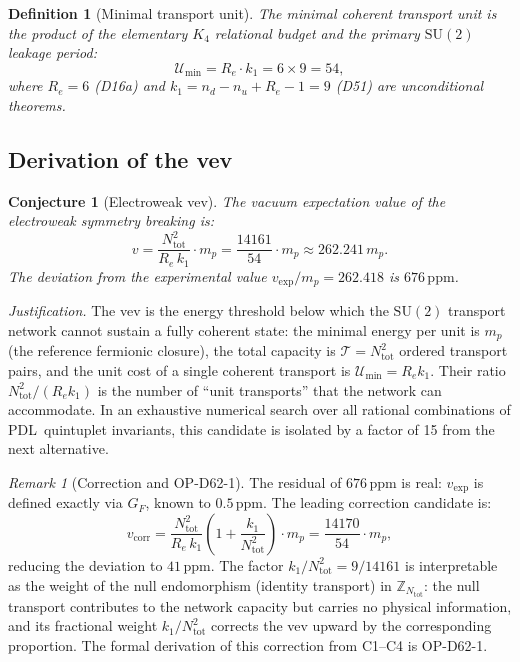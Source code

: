 \documentclass[12pt,a4paper]{article}
\newtheorem{definition}[theorem]{Definition}
\newtheorem{conjecture}[theorem]{Conjecture}
\theoremstyle{remark}
\newtheorem{remark}[theorem]{Remark}
\newcommand{\PDL}{\textsc{pdl}}
\newcommand{\Ntot}{N_{\mathrm{tot}}}
\newcommand{\vev}{v}
\newcommand{\ppm}{\,\mathrm{ppm}}
\newcommand{\mproton}{m_{p}}
\def\PDL{PDL}%
\begin{document}
\begin{definition}[Minimal transport unit]\label{def:mtu}
The minimal coherent transport unit is the product of the elementary $K_4$
relational budget and the primary $\mathrm{SU}(2)$ leakage period:
\begin{equation}
\mathcal{U}_{\min} = R_{e}\cdot k_{1} = 6\times9 = 54,
\end{equation}
where $R_{e}=6$ (D16a) and $k_{1}=n_{d}-n_{u}+R_{e}-1=9$ (D51) are
unconditional theorems.
\end{definition}

\subsection{Derivation of the vev}

\begin{conjecture}[Electroweak vev]\label{conj:vev}
The vacuum expectation value of the electroweak symmetry breaking is:
\begin{equation}\label{eq:vev}
\vev = \frac{\Ntot^{2}}{R_{e}\,k_{1}}\cdot\mproton
= \frac{14161}{54}\cdot\mproton \approx 262.241\,\mproton.
\end{equation}
The deviation from the experimental value $\vev_{\exp}/\mproton=262.418$ is
$676\ppm$.
\end{conjecture}

\emph{Justification.} The vev is the energy threshold below which the
$\mathrm{SU}(2)$ transport network cannot sustain a fully coherent state: the
minimal energy per unit is $\mproton$ (the reference fermionic closure), the
total capacity is $\mathcal{T}=\Ntot^{2}$ ordered transport pairs, and the
unit cost of a single coherent transport is $\mathcal{U}_{\min}=R_{e}k_{1}$.
Their ratio $\Ntot^{2}/(R_{e}k_{1})$ is the number of ``unit transports''
that the network can accommodate. In an exhaustive numerical search over all
rational combinations of \PDL\ quintuplet invariants, this candidate is
isolated by a factor of 15 from the next alternative.

\begin{remark}[Correction and OP-D62-1]\label{rem:vcorr}
The residual of $676\ppm$ is real: $\vev_{\exp}$ is defined exactly via
$G_{F}$, known to $0.5\ppm$. The leading correction candidate is:
\begin{equation}\label{eq:vcorr}
\vev_{\mathrm{corr}} = \frac{\Ntot^{2}}{R_{e}\,k_{1}}
\left(1+\frac{k_{1}}{\Ntot^{2}}\right)\cdot\mproton
= \frac{14170}{54}\cdot\mproton,
\end{equation}
reducing the deviation to $41\ppm$. The factor $k_{1}/\Ntot^{2}=9/14161$ is
interpretable as the weight of the null endomorphism (identity transport) in
$\mathbb{Z}_{\Ntot}$: the null transport contributes to the network capacity
but carries no physical information, and its fractional weight
$k_{1}/\Ntot^{2}$ corrects the vev upward by the corresponding proportion.
The formal derivation of this correction from C1--C4 is OP-D62-1.
\end{remark}
\end{document}
